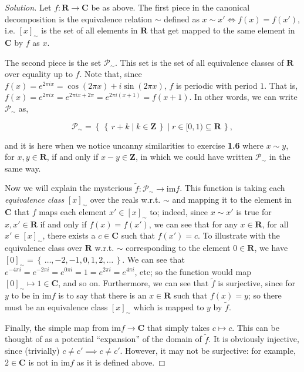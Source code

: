\documentclass[fontsize=14pt]{scrartcl}
\newenvironment{solution}{
  \begin{proof}[Solution]
  \vspace{-8px}
  \setlength{\parskip}{4px}
  \setlength{\parindent}{0px}
}{
  \end{proof}
}
\newcommand{\set}[1]{\left\{\,#1\,\right\}}
\newcommand{\im}{\mathrm{im}}
\begin{document}
\begin{solution}
Let $f:\mathbf{R}\to\mathbf{C}$ be as above. The first piece in the canonical
decomposition is the equivalence relation $\sim$ defined as $x \sim x' \iff f(x) =
f(x')$, i.e. $[x]_{\sim}$ is the set of all elements in $\mathbf{R}$ that get
mapped to the same element in $\mathbf{C}$ by $f$ as $x$.

The second piece is the set $\mathscr{P}_{\sim}$. This set is the set of all
equivalence classes of $\mathbf{R}$ over equality up to $f$. Note that, since
$f(x) = e^{2\pi i x} = \cos(2\pi x) + i\sin(2\pi x)$, $f$ is periodic with
period $1$. That is, $f(x) = e^{2\pi i x} = e^{2\pi i x + 2\pi} = e^{2\pi i (x +
1)} = f(x+1)$. In other words, we can write $\mathscr{P}_{\sim}$ as,

\[ \mathscr{P}_{\sim} = \set{\set{r + k\mid k\in\mathbf{Z}}\mid
r\in[0,1)\subseteq\mathbf{R}}, \]

and it is here when we notice uncanny similarities to exercise \textbf{1.6}
where $x\sim y$, for $x,y\in\mathbf{R}$, if and only if $x-y\in\mathbf{Z}$, in
which we could have written $\mathscr{P}_{\sim}$ in the same way. 

Now we will explain the mysterious $\tilde{f}:\mathscr{P}_{\sim}\to\im f$. This
function is taking each \textit{equivalence class} $[x]_{\sim}$ over the reals
w.r.t. $\sim$ and mapping it to the element in $\mathbf{C}$ that $f$ maps each
element $x'\in[x]_{\sim}$ to; indeed, since $x\sim x'$ is true for
$x,x'\in\mathbf{R}$ if and only if $f(x)=f(x')$, we can see that for any
$x\in\mathbf{R}$, for all $x'\in[x]_{\sim}$, there exists a $c\in\mathbf{C}$
such that $f(x') = c$. To illustrate with the equivalence class over
$\mathbf{R}$ w.r.t. $\sim$ corresponding to the element $0\in\mathbf{R}$, we
have $[0]_{\sim} = \set{\dots, -2, -1, 0, 1, 2, \dots}$.  We can see that
$e^{-4\pi i} = e^{-2\pi i} = e^{0\pi i} = 1 = e^{2\pi i} = e^{4\pi i}$, etc; so
the function would map $[0]_{\sim}\mapsto1\in\mathbf{C}$, and so on.
Furthermore, we can see that $\tilde{f}$ is surjective, since for $y$ to be in
$\im f$ is to say that there is an $x\in\mathbf{R}$ such that $f(x) = y$; so
there must be an equivalence class $[x]_{\sim}$ which is mapped to $y$ by
$\tilde{f}$.

Finally, the simple map from $\im f\to\mathbf{C}$ that simply takes $c\mapsto
c$. This can be thought of as a potential ``expansion'' of the domain of
$\tilde{f}$. It is obviously injective, since (trivially) $c\neq c'\implies
c\neq c'$. However, it may not be surjective: for example, $2\in\mathbf{C}$ is
not in $\im f$ as it is defined above.
\end{solution}
\end{document}
